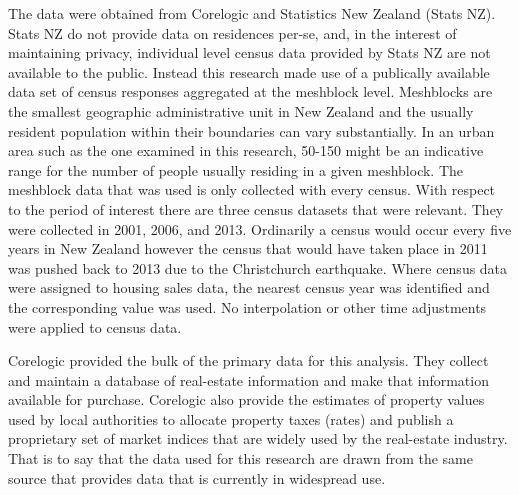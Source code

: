 \documentclass[]{article}
\begin{document}
The data were obtained from Corelogic and Statistics New Zealand (Stats
NZ). Stats NZ do not provide data on residences per-se, and, in the
interest of maintaining privacy, individual level census data provided
by Stats NZ are not available to the public. Instead this research made
use of a publically available data set of census responses aggregated at
the meshblock level. Meshblocks are the smallest geographic
administrative unit in New Zealand and the usually resident population
within their boundaries can vary substantially. In an urban area such as
the one examined in this research, 50-150 might be an indicative range
for the number of people usually residing in a given meshblock. The
meshblock data that was used is only collected with every census. With
respect to the period of interest there are three census datasets that
were relevant. They were collected in 2001, 2006, and 2013. Ordinarily a
census would occur every five years in New Zealand however the census
that would have taken place in 2011 was pushed back to 2013 due to the
Christchurch earthquake. Where census data were assigned to housing
sales data, the nearest census year was identified and the corresponding
value was used. No interpolation or other time adjustments were applied
to census data.

Corelogic provided the bulk of the primary data for this analysis. They
collect and maintain a database of real-estate information and make that
information available for purchase. Corelogic also provide the estimates
of property values used by local authorities to allocate property taxes
(rates) and publish a proprietary set of market indices that are widely
used by the real-estate industry. That is to say that the data used for
this research are drawn from the same source that provides data that is
currently in widespread use.
\end{document}
